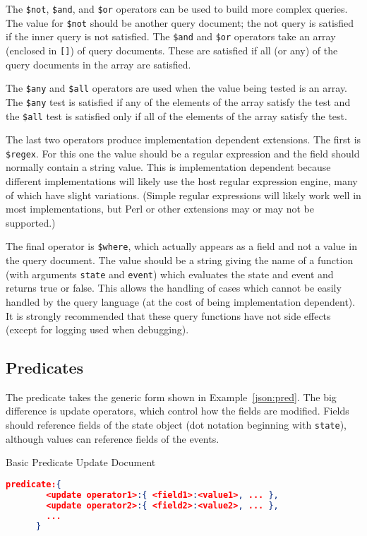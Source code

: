 \documentclass{article}
\begin{document}
  The \texttt{\$not}, \texttt{\$and}, and \texttt{\$or} operators can
  be used to build more complex queries.  The value for \texttt{\$not}
  should be another query document; the not query is satisfied if the
  inner query is not satisfied.  The \texttt{\$and} and \texttt{\$or}
  operators take an array (enclosed in \texttt{[]}) of query
  documents.  These are satisfied if all (or any) of the query
  documents in the array are satisfied.

  The \texttt{\$any} and \texttt{\$all} operators are used when the
  value being tested is an array.  The \texttt{\$any} test is
  satisfied if any of the elements of the array satisfy the test
  and the \texttt{\$all} test is satisfied only if all of the
  elements of the array satisfy the test.
  
  The last two operators produce implementation dependent extensions.
  The first is \texttt{\$regex}.  For this one the value should be a
  regular expression and the field should normally contain a string
  value.  This is implementation dependent because different
  implementations will likely use the host regular expression engine,
  many of which have slight variations.  (Simple regular expressions
  will likely work well in most implementations, but Perl or other
  extensions may or may not be supported.) 

  The final operator is \texttt{\$where}, which actually appears as a
  field and not a value in the query document.  The value should be a
  string giving the name of a function (with arguments \texttt{state}
  and \texttt{event}) which evaluates the state and event and returns
  true or false.  This allows the handling of cases which cannot be
  easily handled by the query language (at the cost of being
  implementation dependent).  It is strongly recommended that these
  query functions have not side effects (except for logging used when
  debugging).  

  \subsection{Predicates}
  \label{sub:pred}

  The predicate takes the generic form shown in
  Example~\ref{json:pred}. The big difference is update operators,
  which control how the fields are modified.  Fields should reference
  fields of the state object (dot notation beginning with
  \texttt{state}), although values can reference fields of the
  events. 

  \begin{algorithm}
    \caption{Basic Predicate Update Document}
    \label{json:pred}
    \begin{lstlisting}[language=json]
      predicate:{
        <update operator1>:{ <field1>:<value1>, ... },
        <update operator2>:{ <field2>:<value2>, ... },
        ...
      }
    \end{lstlisting}
  \end{algorithm}
\end{document}
